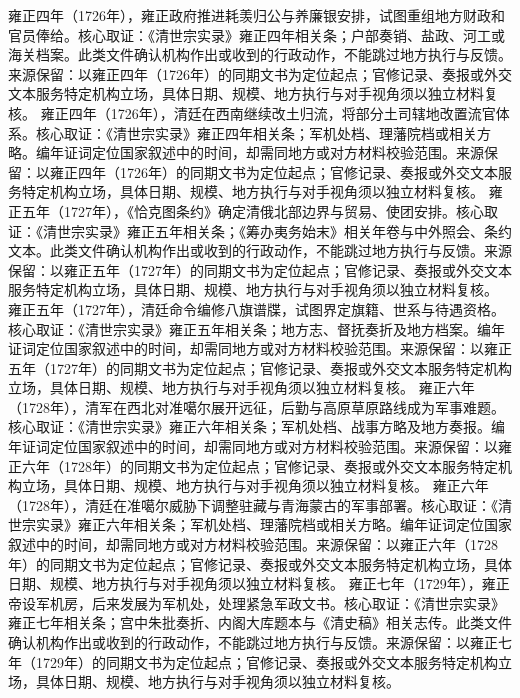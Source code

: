 雍正四年（1726年），雍正政府推进耗羡归公与养廉银安排，试图重组地方财政和官员俸给。核心取证：《清世宗实录》雍正四年相关条；户部奏销、盐政、河工或海关档案。此类文件确认机构作出或收到的行政动作，不能跳过地方执行与反馈。来源保留：以雍正四年（1726年）的同期文书为定位起点；官修记录、奏报或外交文本服务特定机构立场，具体日期、规模、地方执行与对手视角须以独立材料复核。
雍正四年（1726年），清廷在西南继续改土归流，将部分土司辖地改置流官体系。核心取证：《清世宗实录》雍正四年相关条；军机处档、理藩院档或相关方略。编年证词定位国家叙述中的时间，却需同地方或对方材料校验范围。来源保留：以雍正四年（1726年）的同期文书为定位起点；官修记录、奏报或外交文本服务特定机构立场，具体日期、规模、地方执行与对手视角须以独立材料复核。
雍正五年（1727年），《恰克图条约》确定清俄北部边界与贸易、使团安排。核心取证：《清世宗实录》雍正五年相关条；《筹办夷务始末》相关年卷与中外照会、条约文本。此类文件确认机构作出或收到的行政动作，不能跳过地方执行与反馈。来源保留：以雍正五年（1727年）的同期文书为定位起点；官修记录、奏报或外交文本服务特定机构立场，具体日期、规模、地方执行与对手视角须以独立材料复核。
雍正五年（1727年），清廷命令编修八旗谱牒，试图界定旗籍、世系与待遇资格。核心取证：《清世宗实录》雍正五年相关条；地方志、督抚奏折及地方档案。编年证词定位国家叙述中的时间，却需同地方或对方材料校验范围。来源保留：以雍正五年（1727年）的同期文书为定位起点；官修记录、奏报或外交文本服务特定机构立场，具体日期、规模、地方执行与对手视角须以独立材料复核。
雍正六年（1728年），清军在西北对准噶尔展开远征，后勤与高原草原路线成为军事难题。核心取证：《清世宗实录》雍正六年相关条；军机处档、战事方略及地方奏报。编年证词定位国家叙述中的时间，却需同地方或对方材料校验范围。来源保留：以雍正六年（1728年）的同期文书为定位起点；官修记录、奏报或外交文本服务特定机构立场，具体日期、规模、地方执行与对手视角须以独立材料复核。
雍正六年（1728年），清廷在准噶尔威胁下调整驻藏与青海蒙古的军事部署。核心取证：《清世宗实录》雍正六年相关条；军机处档、理藩院档或相关方略。编年证词定位国家叙述中的时间，却需同地方或对方材料校验范围。来源保留：以雍正六年（1728年）的同期文书为定位起点；官修记录、奏报或外交文本服务特定机构立场，具体日期、规模、地方执行与对手视角须以独立材料复核。
雍正七年（1729年），雍正帝设军机房，后来发展为军机处，处理紧急军政文书。核心取证：《清世宗实录》雍正七年相关条；宫中朱批奏折、内阁大库题本与《清史稿》相关志传。此类文件确认机构作出或收到的行政动作，不能跳过地方执行与反馈。来源保留：以雍正七年（1729年）的同期文书为定位起点；官修记录、奏报或外交文本服务特定机构立场，具体日期、规模、地方执行与对手视角须以独立材料复核。
